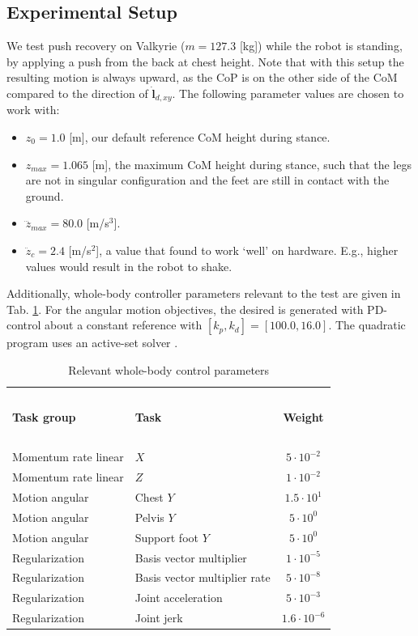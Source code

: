 \documentclass[letterpaper, 10 pt, conference]{ieeeconf}  %
\newcommand{\zmax}{z_{max}}
\begin{document}
\subsection{Experimental Setup}
We test push recovery on Valkyrie ($m=127.3$ [kg]) while the robot is standing, by applying a push from the back at chest height. Note that with this setup the resulting motion is always upward, as the CoP is on the other side of the CoM compared to the direction of $\dot{\mathbf{l}}_{d,xy}$. The following parameter values are chosen to work with:
\begin{itemize}
\item $z_0=1.0$ [m], our default reference CoM height during stance.
\item $\zmax=1.065$ [m], the maximum CoM height during stance, such that the legs are not in singular configuration and the feet are still in contact with the ground.
\item $\dddot{z}_{max} = 80.0$ [m/s$^3$].
\item $\ddot{z}_c=2.4$ [m/s$^2$], a value that found to work `well' on hardware. E.g., higher values would result in the robot to shake. 
\end{itemize}

Additionally, whole-body controller parameters relevant to the test are given in Tab. \ref{tab:params}. For the angular motion objectives, the desired is generated with PD-control about a constant reference with $[k_p, k_d]=[100.0,16.0]$. The quadratic program uses an active-set solver \cite{kuindersma2014efficiently}.
\begin{table}[h]
\caption{Relevant whole-body control parameters}
\label{tab:params}
\begin{center}
\begin{tabular}{llc}
\hline~\\[-2ex]
\textbf{Task group} & \textbf{Task} & \textbf{Weight}\\
\hline ~\\[-2ex]
Momentum rate linear& $X$ & $5 \cdot 10^{-2}$\\
Momentum rate linear& $Z$ & $1 \cdot 10^{-2}$\\
Motion angular& Chest $Y$ &    $1.5 \cdot 10^1$\\
Motion angular& Pelvis $Y$ &  $5 \cdot 10^0$\\
Motion angular& Support foot $Y$ &  $5 \cdot 10^0$\\
Regularization & Basis vector multiplier&  $1 \cdot 10^{-5}$\\
Regularization & Basis vector multiplier rate & $5 \cdot 10^{-8}$\\
Regularization & Joint acceleration & $5 \cdot 10^{-3}$\\
Regularization & Joint jerk & $1.6 \cdot 10^{-6}$\\
\hline
\end{tabular}
\end{center}
\end{table}
\end{document}
